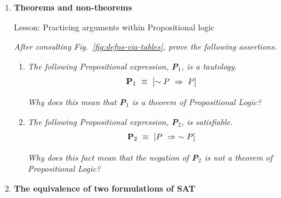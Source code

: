 {\begin{enumerate}
\begin{enumerate}
{\em Hint:}
\begin{itemize}
\item
As you create a new string of numbers, in how many ways can you choose {\em the first number}? {\em the second number}? \ldots
\medskip\item
Based on your answers for the first and second and third numbers of the new string, in how many ways can you choose {\em the first two numbers---i.e., the first {\em pair} of numbers}? {\em the next two numbers}? \ldots
\end{itemize}
  \medskip\item
{\em Strengthen your argument by listing all permutations of  $S' =  \{1,2,3,4,5\}$.}

\smallskip

Write small---there are a lot of permutations.
  \medskip\item
$\oplus \oplus$ {\em Extrapolate from your argument to determine the number of permutations of the set $S" =  \{1,2,3, \ldots, n\}$, as a function of $n$.}
  \end{enumerate}  

\medskip\item
{\bf Theorems and non-theorems}

{\sc Lesson:} Practicing arguments within Propositional logic

\smallskip

{\em
After consulting Fig.~\ref{fig:defns-via-tables}, prove the following assertions.}

\smallskip

\begin{enumerate}
\item
{\em The following Propositional expression, {\bf P}$_1$, is a tautology.}
\[ {\bf P}_1 \ \equiv \ \left[ \sim P \ \Rightarrow \ P \right] \]


\smallskip

{\em Why does this mean that {\bf P}$_1$ is a {\em theorem} of Propositional Logic?}

\medskip\item
{\em The following Propositional expression, {\bf P}$_2$, is satisfiable.}
\[ {\bf P}_2 \ \equiv \ \left[ P \ \Rightarrow \ \sim P \right] \]

\smallskip

{\em Why does this fact mean that the {\em negation} of {\bf P}$_2$ is {\em not a theorem} of Propositional Logic?}
\end{enumerate}

\medskip\item
{\bf The equivalence of two formulations of SAT}


\end{enumerate}}
